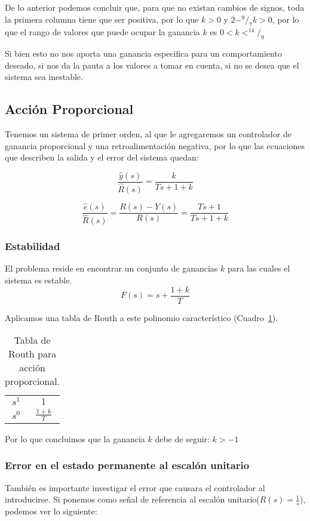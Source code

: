 \documentclass[12pt]{article}
\numberwithin{equation}{subsection}
\begin{document}
De lo anterior podemos concluir que, para que no existan cambios de signos, toda la primera columna tiene que ser positiva, por lo que $k > 0$ y  $2 - ^9/_7 k > 0$, por lo que el rango de valores que puede ocupar la ganancia $k$ es $0 < k < ^{14}/_9$

Si bien esto no nos aporta una ganancia especifica para un comportamiento deseado, si nos da la pauta a los valores a tomar en cuenta, si no se desea que el sistema sea inestable.

\subsection{Acción Proporcional}
Tenemos un sistema de primer orden, al que le agregaremos un controlador de ganancia proporcional y una retroalimentación negativa, por lo que las ecuaciones que describen la salida y el error del sistema quedan:

\begin{equation}
\frac{\hat{y}(s)}{\hat{R}(s)} = \frac{k}{Ts + 1 + k}
\end{equation}

\begin{equation}
\frac{\hat{e}(s)}{\hat{R}(s)} = \frac{R(s) - Y(s)}{R(s)} = \frac{Ts + 1}{Ts + 1 + k}
\end{equation}

\subsubsection{Estabilidad}
El problema reside en encontrar un conjunto de ganancias $k$ para las cuales el sistema es estable.
\begin{equation}
F(s) = s + \frac{1 + k}{T}
\end{equation}

Aplicamos una tabla de Routh a este polinomio característico (Cuadro~\ref{tab:AccionProporcional}).

\begin{table}[htbp]
\centering
\begin{tabular}{c|c}
$s^1$ & $1$ \\
$s^0$ & $\frac{1+k}{T}$
\end{tabular}
\caption{\label{tab:AccionProporcional}Tabla de Routh para acción proporcional.}
\end{table}

Por lo que concluimos que la ganancia $k$ debe de seguir: $k>-1$

\subsubsection{Error en el estado permanente al escalón unitario}
También es importante investigar el error que causara el controlador al introducirse. Si ponemos como señal de referencia al escalón unitario($R(s) = \frac{1}{s}$), podemos ver lo siguiente:
\end{document}
